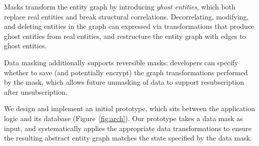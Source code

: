 Masks transform the entity graph by introducing \emph{ghost entities}, which both replace real
entities and break structural correlations.  Decorrelating, modifying, and deleting entities in the
graph can expressed via transformations that produce ghost entities from real entities, and
restructure the entity graph with edges to ghost entities. 

Data masking additionally supports reversible masks: developers can specify whether to save (and
potentially encrypt) the graph transformations performed by the mask, which allows future unmasking
of data to support \eg resubscription after unsubscription.

We design and implement an initial prototype, which sits between the application logic and its
database (Figure~\ref{fig:arch}). Our prototype takes a data mask as input, and systematically
applies the appropriate data transformations to ensure the resulting abstract entity graph matches
the state specified by the data mask.
